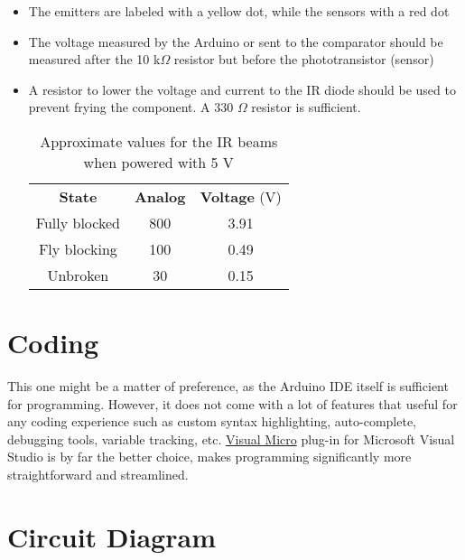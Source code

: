 \documentclass[12pt]{article}
\begin{document}
\begin{itemize}
	\item The emitters are labeled with a yellow dot, while the sensors with a red dot
	\item The voltage measured by the Arduino or sent to the comparator should be measured after the 10 k$\Omega$ resistor but before the phototransistor (sensor)
	\item A resistor to lower the voltage and current to the IR diode should be used to prevent frying the component. A 330 $\Omega$ resistor is sufficient.
	\begin{table}[H]
		\centering
		\begin{tabular}{c | c | c}
			\textbf{State} 	& \textbf{Analog} & \textbf{Voltage} (V) \\ \cline{1-3}
			Fully blocked 	& 800  & 3.91\\
			Fly blocking	& 100  & 0.49\\
			Unbroken 		& 30   & 0.15\\ 
		\end{tabular}
		\caption{Approximate values for the IR beams when powered with 5 V}
		\label{tbl:irstates}
	\end{table}
\end{itemize}

\section{Coding}
This one might be a matter of preference, as the Arduino IDE itself is sufficient for programming. However, it does not come with a lot of features that useful for any coding experience such as custom syntax highlighting, auto-complete, debugging tools, variable tracking, etc. \href{https://www.visualmicro.com/}{Visual Micro} plug-in for Microsoft Visual Studio is by far the better choice, makes programming significantly more straightforward and streamlined.

\section{Circuit Diagram}

\end{document}
